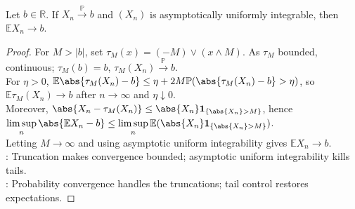 \begin{proposition} \label{prop:aui-plus-probability-gives-expectation-convergence} \\
Let $b\in\mathbb{R}$. If $X_n\xrightarrow{\mathbb{P}}b$ and $(X_n)$ is asymptotically uniformly integrable, then $\mathbb{E}X_n\to b$.
\begin{proof}
For $M>|b|$, set $\tau_M(x)=(-M)\vee(x\wedge M)$. As $\tau_M$ bounded, continuous; $\tau_M(b)=b$, $\tau_M(X_n)\xrightarrow{\mathbb{P}}b$.\\
For $\eta>0$, $\mathbb{E}\abs{\tau_M(X_n)-b}\leq\eta+2M\mathbb{P}(\abs{\tau_M(X_n)-b}>\eta)$, so $\mathbb{E}\tau_M(X_n)\to b$ after $n\to\infty$ and $\eta\downarrow0$.\\
Moreover, $\abs{X_n-\tau_M(X_n)}\leq\abs{X_n}\mathbf{1}_{\{\abs{X_n}>M\}}$, hence $\limsup\limits_n\abs{\mathbb{E}X_n-b}\leq\limsup\limits_n\mathbb{E}(\abs{X_n}\mathbf{1}_{\{\abs{X_n}>M\}})$.\\
Letting $M\to\infty$ and using asymptotic uniform integrability gives $\mathbb{E}X_n\to b$.\\
: Truncation makes convergence bounded; asymptotic uniform integrability kills tails.\\
: Probability convergence handles the truncations; tail control restores expectations.
\end{proof}
\end{proposition}

